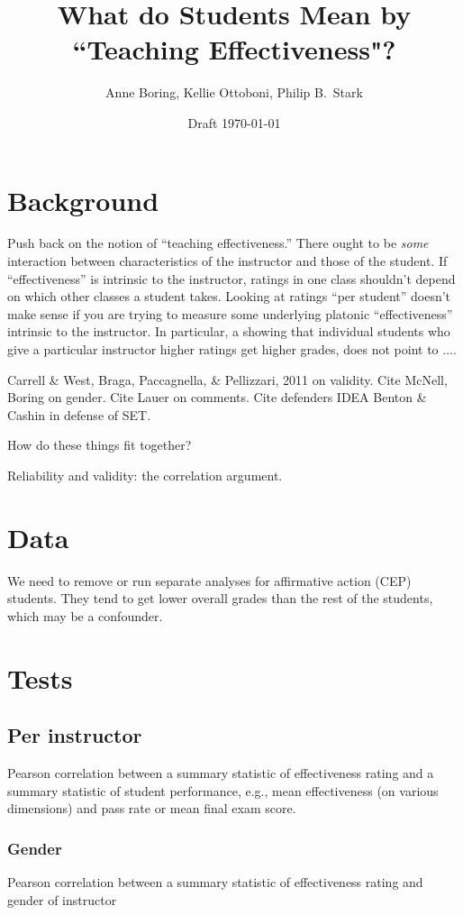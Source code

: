 \documentclass[12pt]{article}
\title{What do Students Mean by ``Teaching Effectiveness"?}
\author{Anne Boring, Kellie Ottoboni, Philip B.~Stark}
\date{Draft \today}
\newcommand{\todo}[1]{{\color{red}{TO DO: \sc #1}}}
\begin{document}
\maketitle

\section{Background}
Push back on the notion of ``teaching effectiveness.''
There ought to be \emph{some} interaction between characteristics of the
instructor and those of the student.
If ``effectiveness'' is intrinsic to the instructor, ratings in one class shouldn't depend on
which other classes a student takes.
Looking at ratings ``per student'' doesn't make sense if you are trying to
measure some underlying platonic ``effectiveness'' intrinsic to the instructor.
In particular,  a showing that individual students who give a particular instructor higher ratings
get higher grades, does not point to ....\todo{fix me}

Carrell \& West, Braga, Paccagnella, \& Pellizzari, 2011 on validity.
Cite McNell, Boring on gender.
Cite Lauer on comments.
Cite defenders IDEA Benton \& Cashin in defense of SET.  

How do these things fit together?

Reliability and validity: the correlation argument.

\section{Data}
\todo{Anne to provide description. Triads, etc.}
We need to remove or run separate analyses for affirmative action (CEP) students. They tend to get lower overall grades than the rest of the students, which may be a confounder.

\section{Tests}

\subsection{Per instructor}
Pearson correlation between a summary statistic of effectiveness rating and a summary statistic
of student performance, e.g., mean effectiveness (on various dimensions) and pass rate or mean
final exam score.
\todo{code is ready.  Do we do all metrics?}

\subsubsection{Gender}
Pearson correlation between a summary statistic of effectiveness rating and gender of instructor
\todo{code is ready.  Do we do all metrics?}
\end{document}
